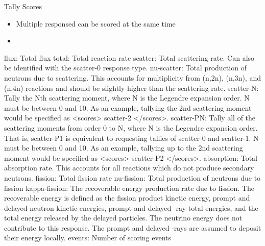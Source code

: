\documentclass[serif]{beamer}
\begin{document}
\begin{frame}[fragile]{Tally Scores}

  \begin{itemize}
    \item Multiple responsed can be scored at the same time
    \item 
  \end{itemize}

flux:           Total flux
total:          Total reaction rate
scatter:        Total scattering rate. Can also be identified with the scatter-0 response type.
nu-scatter:     Total production of neutrons due to scattering. This accounts for multiplicity from (n,2n), (n,3n), and (n,4n) reactions and should be slightly higher than the scattering rate.
scatter-N:      Tally the Nth scattering moment, where N is the Legendre expansion order. N must be between 0 and 10. As an example, tallying the 2nd scattering moment would be specified as <scores> scatter-2 </scores>.
scatter-PN:     Tally all of the scattering moments from order 0 to N, where N is the Legendre expansion order. That is, scatter-P1 is equivalent to requesting tallies of scatter-0 and scatter-1. N must be between 0 and 10. As an example, tallying up to the 2nd scattering moment would be specified as <scores> scatter-P2 </scores>.
absorption:     Total absorption rate. This accounts for all reactions which do not produce secondary neutrons.
fission:        Total fission rate
nu-fission:     Total production of neutrons due to fission
kappa-fission:  The recoverable energy production rate due to fission. The recoverable energy is defined as the fission product kinetic energy, prompt and delayed neutron kinetic energies, prompt and delayed -ray total energies, and the total energy released by the delayed  particles. The neutrino energy does not contribute to this response. The prompt and delayed -rays are assumed to deposit their energy locally.
events:         Number of scoring events

  \begin{scriptsize}
    \begin{lstlisting}[language=XML,gobble=4]

    \end{lstlisting}
  \end{scriptsize}

\end{frame}

\end{document}
